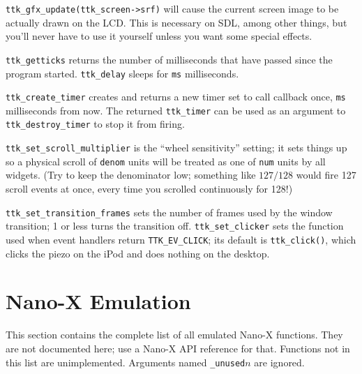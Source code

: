 \documentclass[12pt,letterpaper]{report}
\begin{document}
\verb|ttk_gfx_update(ttk_screen->srf)| will cause the current screen image to be actually
drawn on the LCD. This is necessary on SDL, among other things, but you'll never have to
use it yourself unless you want some special effects.

\verb|ttk_getticks| returns the number of milliseconds that have passed since the program
started. \verb|ttk_delay| sleeps for \verb|ms| milliseconds.

\verb|ttk_create_timer| creates and returns a new timer set to call {\sf callback} once, \verb|ms| milliseconds
from now. The returned \verb|ttk_timer| can be used as an argument to \verb|ttk_destroy_timer|
to stop it from firing.

\verb|ttk_set_scroll_multiplier| is the ``wheel sensitivity'' setting;
it sets things up so a physical scroll of \verb|denom| units will be treated
as one of \verb|num| units by all widgets. (Try to keep the denominator low;
something like $127/128$ would fire 127 scroll events at once, every time
you scrolled continuously for 128!)

\verb|ttk_set_transition_frames| sets the number of frames used by the window transition;
1 or less turns the transition off. \verb|ttk_set_clicker| sets the function used when
event handlers return \verb|TTK_EV_CLICK|; its default is \verb|ttk_click()|, which clicks
the piezo on the iPod and does nothing on the desktop.

\section{Nano-X Emulation}
This section contains the complete list of all emulated Nano-X functions. They are not documented
here; use a Nano-X API reference for that.
Functions not in this list are unimplemented. Arguments named \verb|_unused|$n$ are ignored.
\end{document}
